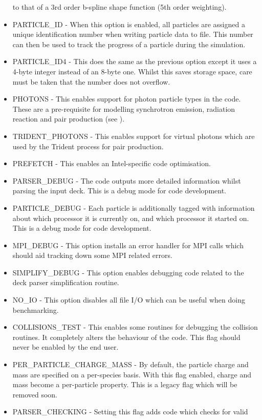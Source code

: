 \begin{itemize}
  to that of a 3rd order b-spline shape function (5th order weighting).
\item PARTICLE\_ID - When this option is enabled, all particles are assigned
  a unique identification number when writing particle data to file. This
  number can then be used to track the progress of a particle during the
  simulation.
\item PARTICLE\_ID4 - This does the same as the previous option except it uses
  a 4-byte integer instead of an 8-byte one. Whilst this saves storage space,
  care must be taken that the number does not overflow.
\item PHOTONS - This enables support for photon particle types in the code.
  These are a pre-requisite for modelling synchrotron emission, radiation
  reaction and pair production (see ).
\item TRIDENT\_PHOTONS - This enables support for virtual photons which are
  used by the Trident process for pair production.
\item PREFETCH - This enables an Intel-specific code optimisation.
\item PARSER\_DEBUG - The code outputs more detailed information whilst
  parsing the input deck. This is a debug mode for code development.
\item PARTICLE\_DEBUG - Each particle is additionally tagged with information
  about which processor it is currently on, and which processor it started
  on. This is a debug mode for code development.
\item MPI\_DEBUG - This option installs an error handler for MPI calls which
  should aid tracking down some MPI related errors.
\item SIMPLIFY\_DEBUG - This option enables debugging code related to the
  deck parser simplification routine.
\item NO\_IO - This option disables all file I/O which can be useful when
  doing benchmarking.
\item COLLISIONS\_TEST - This enables some routines for debugging the collision
  routines. It completely alters the behaviour of the code. This flag should
  never be enabled by the end user.
\item PER\_PARTICLE\_CHARGE\_MASS - By default, the particle charge and
  mass are specified on a per-species basis. With this flag enabled, charge
  and mass become a per-particle property. This is a legacy flag which will
  be removed soon.
\item PARSER\_CHECKING - Setting this flag adds code which checks for valid

\end{itemize}
